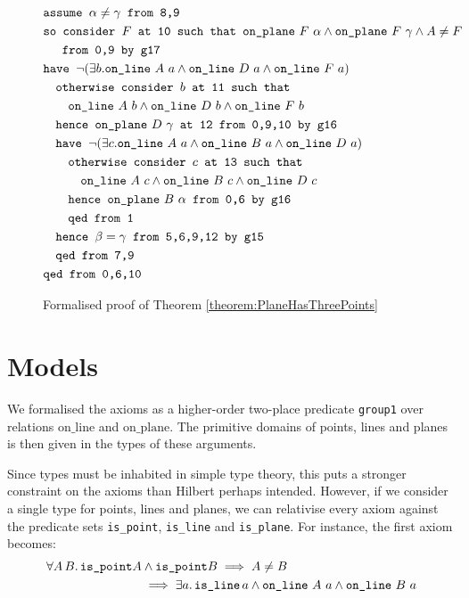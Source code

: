 \begin{figure}
\begin{align*}
&\texttt{assume } \alpha\neq\gamma \texttt{ from 8,9}\\
&\texttt{so consider } F \texttt{ at 10 such that }\texttt{on\_plane}\ F\ \alpha\wedge \texttt{on\_plane}\ F\ \gamma\wedge A \neq F \\
&\quad\texttt{ from 0,9 by g17}\\
&\texttt{have }\neg(\exists b.\texttt{on\_line}\ A\ a\wedge \texttt{on\_line}\ D\ a\wedge \texttt{on\_line}\ F\ a)\\
&\quad\texttt{otherwise consider } b \texttt{ at 11 such that }\\
&\quad\quad\texttt{on\_line}\ A\ b\wedge \texttt{on\_line}\ D\ b\wedge \texttt{on\_line}\ F\ b\\
&\quad\texttt{hence }\texttt{on\_plane}\ D\ \gamma\texttt{ at 12 from 0,9,10 by g16}\\
&\quad\texttt{have }\neg(\exists c.\texttt{on\_line}\ A\ a\wedge \texttt{on\_line}\ B\ a\wedge \texttt{on\_line}\ D\ a)\\
&\quad\quad\texttt{otherwise consider } c \texttt{ at 13 such that }\\
&\quad\quad\quad\texttt{on\_line}\ A\ c\wedge \texttt{on\_line}\ B\ c\wedge \texttt{on\_line}\ D\ c\\
&\quad\quad\texttt{hence }\texttt{on\_plane}\ B\ \alpha\texttt{ from 0,6 by g16}\\
&\quad\quad\texttt{qed from 1}\\
&\quad\texttt{hence }\beta=\gamma \texttt{ from 5,6,9,12 by g15}\\
&\quad\texttt{qed from 7,9}\\
&\texttt{qed from 0,6,10}
\end{align*}
\caption{Formalised proof of Theorem \ref{theorem:PlaneHasThreePoints}}
\label{fig:PlaneHasThreePoints}
\end{figure}

\section{Models}
We formalised the axioms as a higher-order two-place predicate \texttt{group1} over relations $\text{on\_line}$ and $\text{on\_plane}$. The primitive domains of points, lines and planes is then given in the types of these arguments.

Since types must be inhabited in simple type theory, this puts a stronger constraint on the axioms than Hilbert perhaps intended. However, if we consider a single type for points, lines and planes, we can relativise every axiom against the predicate sets \texttt{is\_point}, \texttt{is\_line} and \texttt{is\_plane}. For instance, the first axiom becomes:
\begin{align*}
\forall A\, B.\, \texttt{is\_point} A &\wedge  \texttt{is\_point} B \implies A \neq B\\
&\implies \exists a.\, \texttt{is\_line}\,a \wedge \texttt{on\_line}\ A\ a \wedge \texttt{on\_line}\ B\ a
\end{align*}

